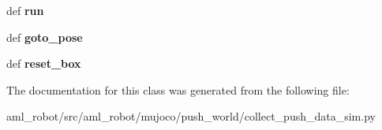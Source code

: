 \begin{DoxyCompactItemize}
\item 
\hypertarget{classaml__robot_1_1mujoco_1_1push__world_1_1collect__push__data__sim_1_1_push_machine_a6c83a07de2192044d842a2959c1c5aa7}{def {\bfseries run}}\label{classaml__robot_1_1mujoco_1_1push__world_1_1collect__push__data__sim_1_1_push_machine_a6c83a07de2192044d842a2959c1c5aa7}

\item 
\hypertarget{classaml__robot_1_1mujoco_1_1push__world_1_1collect__push__data__sim_1_1_push_machine_abfbbe7c2f65cceccc5a093a9030b48c1}{def {\bfseries goto\-\_\-pose}}\label{classaml__robot_1_1mujoco_1_1push__world_1_1collect__push__data__sim_1_1_push_machine_abfbbe7c2f65cceccc5a093a9030b48c1}

\item 
\hypertarget{classaml__robot_1_1mujoco_1_1push__world_1_1collect__push__data__sim_1_1_push_machine_a5d1442a0242e47d42a6042c2c7f511eb}{def {\bfseries reset\-\_\-box}}\label{classaml__robot_1_1mujoco_1_1push__world_1_1collect__push__data__sim_1_1_push_machine_a5d1442a0242e47d42a6042c2c7f511eb}

\end{DoxyCompactItemize}


The documentation for this class was generated from the following file\-:\begin{DoxyCompactItemize}
\item 
aml\-\_\-robot/src/aml\-\_\-robot/mujoco/push\-\_\-world/collect\-\_\-push\-\_\-data\-\_\-sim.\-py\end{DoxyCompactItemize}
